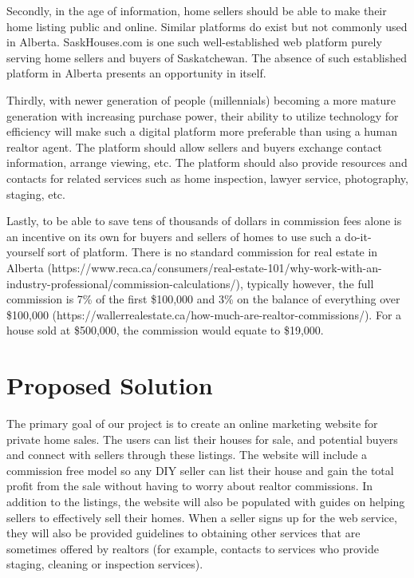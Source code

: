 \documentclass[letterpaper,12pt]{article}
\begin{document}
Secondly, in the age of information, home sellers should be able to make their home listing public and online. Similar platforms do exist but not commonly used in Alberta. SaskHouses.com is one such well-established web platform purely serving home sellers and buyers of Saskatchewan. The absence of such established platform in Alberta presents an opportunity in itself. 

Thirdly, with newer generation of people (millennials) becoming a more mature generation with increasing purchase power, their ability to utilize technology for efficiency will make such a digital platform more preferable than using a human realtor agent. The platform should allow sellers and buyers exchange contact information, arrange viewing, etc. The platform should also provide resources and contacts for related services such as home inspection, lawyer service, photography, staging, etc.

Lastly, to be able to save tens of thousands of dollars in commission fees alone is an incentive on its own for buyers and sellers of homes to use such a do-it-yourself sort of platform. There is no standard commission for real estate in Alberta (https://www.reca.ca/consumers/real-estate-101/why-work-with-an-industry-professional/commission-calculations/), typically however, the full commission is 7\% of the first \$100,000 and 3\% on the balance of everything over \$100,000 (https://wallerrealestate.ca/how-much-are-realtor-commissions/). For a house sold at \$500,000, the commission would equate to \$19,000.


\section{Proposed Solution}

The primary goal of our project is to create an online marketing website for private home sales. The users can list their houses for sale, and potential buyers and connect with sellers through these listings. The website will include a commission free model so any DIY seller can list their house and gain the total profit from the sale without having to worry about realtor commissions. In addition to the listings, the website will also be populated with guides on helping sellers to effectively sell their homes. When a seller signs up for the web service, they will also be provided guidelines to obtaining other services that are sometimes offered by realtors (for example, contacts to services who provide staging, cleaning or inspection services).
\end{document}
